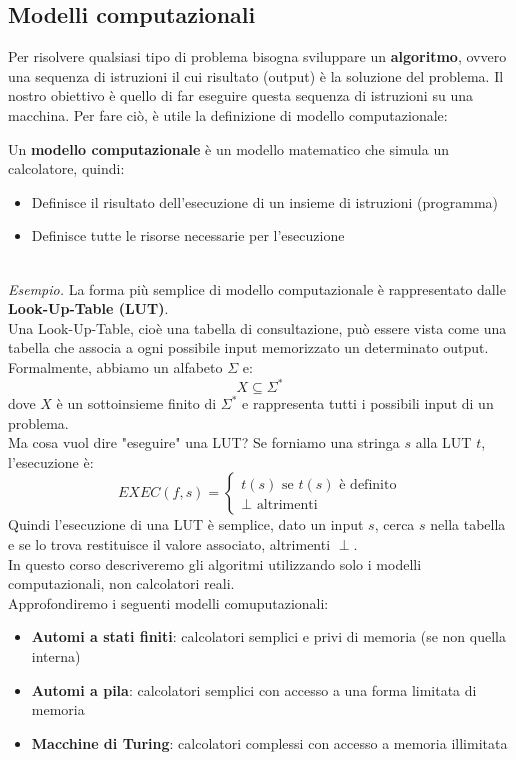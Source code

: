 \subsection{Modelli computazionali}
Per risolvere qualsiasi tipo di problema bisogna sviluppare un \textbf{algoritmo},
ovvero una sequenza di istruzioni il cui risultato (output) è la soluzione del problema.
Il nostro obiettivo è quello di far eseguire questa sequenza di istruzioni su una macchina.
Per fare ciò, è utile la definizione di modello computazionale:\smallskip\\
\colorbox{SALZO}{\parbox{\dimexpr\linewidth-2\fboxsep}{\begin{definition}
   Un \textbf{modello computazionale} è un modello matematico che simula un calcolatore, quindi:
   \begin{itemize}[label= --]
      \item Definisce il risultato dell'esecuzione di un insieme di istruzioni (programma)
      \item Definisce tutte le risorse necessarie per l'esecuzione
   \end{itemize}
\end{definition}}} \smallskip\\
\textit{Esempio.} La forma più semplice di modello computazionale è rappresentato dalle \textbf{Look-Up-Table (LUT)}.\\
Una Look-Up-Table, cioè una tabella di consultazione, può essere vista come una tabella che associa a ogni 
possibile input memorizzato un determinato output. Formalmente, abbiamo un alfabeto \(\Sigma\) e:
\[   X \subseteq \Sigma^*     \]
dove $X$ è un sottoinsieme finito di $\Sigma^*$ e rappresenta tutti i possibili input di un problema.\\
Ma cosa vuol dire "eseguire" una LUT? Se forniamo una stringa $s$ alla LUT $t$, l'esecuzione è:
\[      EXEC(f,s) = \begin{cases}
   t(s) \text{   se } t(s) \text{ è definito} \\
   \perp \text{   altrimenti}
\end{cases}   \]
Quindi l'esecuzione di una LUT è semplice, dato un input $s$, cerca $s$ nella tabella e se lo trova restituisce il valore associato,
altrimenti $\perp$.\medskip\\
In questo corso descriveremo gli algoritmi utilizzando solo i modelli computazionali, non calcolatori reali.\\
Approfondiremo i seguenti modelli comuputazionali:
\begin{itemize}
   \item \textbf{Automi a stati finiti}: calcolatori semplici e privi di memoria (se non quella interna)
   \item \textbf{Automi a pila}: calcolatori semplici con accesso a una forma limitata di memoria
   \item \textbf{Macchine di Turing}: calcolatori complessi con accesso a memoria illimitata
\end{itemize}
